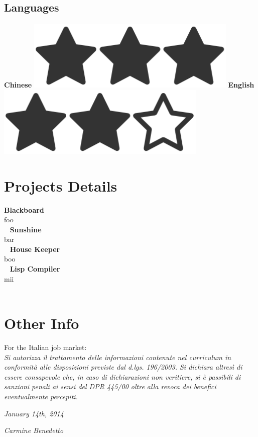 \documentclass[]{friggeri-cv}
\begin{document}
\begin{aside}
  \section{Languages}
    \textbf{Chinese  }\includegraphics[scale=0.07]{img/3heart.png}
    \textbf{English  }\includegraphics[scale=0.07]{img/2heart.png}
\end{aside}

\section{Projects Details }
\textbf{Blackboard\\}
foo\\
~
\textbf{Sunshine\\}
bar\\
~
\textbf{House Keeper\\}
boo\\
~
\textbf{Lisp Compiler\\}
mii\\
~
\section{Other Info}
For the Italian job market:\\
\emph{Si autorizza il trattamento delle informazioni contenute nel curriculum in conformità alle disposizioni previste dal d.lgs. 196/2003. Si dichiara altresì di essere consapevole che, in caso di dichiarazioni non veritiere, si è passibili di sanzioni penali ai sensi del DPR 445/00 oltre alla revoca dei benefici eventualmente percepiti.}
\\
\begin{flushleft}
\emph{January 14th, 2014}
\end{flushleft}
\begin{flushright}
\emph{Carmine Benedetto}
\end{flushright}
\end{document}
